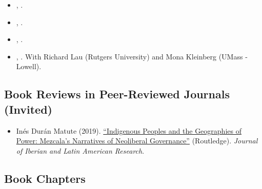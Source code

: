 \begin{itemize}
	\item[\textcolor{gray}{\textbullet}] \href{https://raw.githubusercontent.com/hbahamonde/IncomeTaxAdoption/master/abstract.txt}{\unskip}, {\bf \emph{\unskip}}.

	\item[\textcolor{gray}{\textbullet}]  \href{https://github.com/hbahamonde/Earthquake_Paper/raw/master/Bahamonde_Earthquake_Paper.pdf}{\unskip}, {\bf \emph{\unskip}}.

  	\item[\textcolor{gray}{\textbullet}] \href{https://raw.githubusercontent.com/hbahamonde/Negative_Link_Paper/master/abstract.txt}{\unskip}, {\bf \emph{\unskip}}. 

  	\item[\textcolor{gray}{\textbullet}] \href{https://raw.githubusercontent.com/hbahamonde/Running_Tally/master/abstract.txt}{\unskip}, {\bf \emph{\unskip}}. With Richard Lau (Rutgers University) and Mona Kleinberg (UMass - Lowell). 

\end{itemize}




\subsection*{Book Reviews in Peer-Reviewed Journals (Invited)}

\begin{itemize}
	\item[\textcolor{gray}{\textbullet}] In\'es Dur\'an Matute (2019). \href{https://doi.org/10.1080/13260219.2019.1671679}{``Indigenous Peoples and the Geographies of Power: Mezcala's Narratives of Neoliberal Governance''} (Routledge). \emph{Journal of Iberian and Latin American Research}. %
\end{itemize}

\subsection*{Book Chapters}

